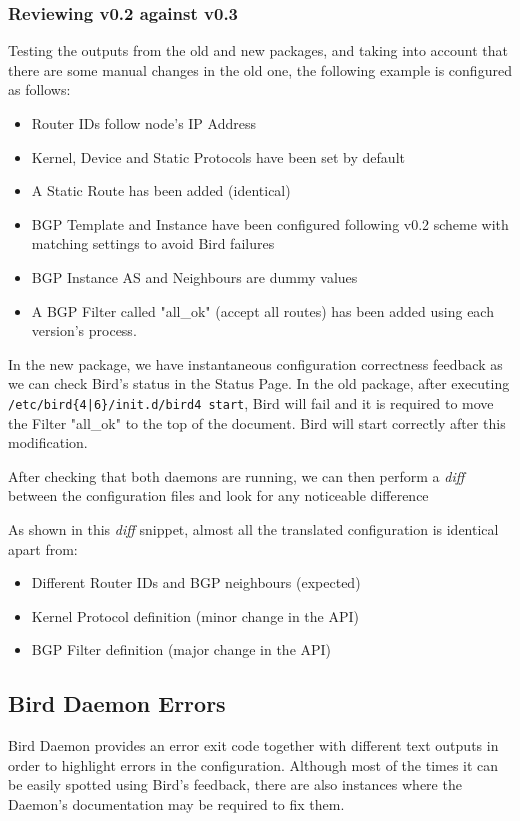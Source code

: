 \subsubsection{Reviewing v0.2 against v0.3}
Testing the outputs from the old and new packages, and taking into account that there are some manual changes in the old one, the following example is configured as follows:

\begin{itemize}
\item Router IDs follow node's IP Address
\item Kernel, Device and Static Protocols have been set by default
\item A Static Route has been added  (identical)
\item BGP Template and Instance have been configured following v0.2 scheme with matching settings to avoid Bird failures
\item BGP Instance AS and Neighbours are dummy values
\item A BGP Filter called "all\_ok" (accept all routes) has been added using each version's process.
\end{itemize}

In the new package, we have instantaneous configuration correctness feedback as we can check Bird's status in the Status Page. 
In the old package, after executing \texttt{/etc/bird\{4|6\}/init.d/bird4 start}, Bird will fail and it is required to move the Filter "all\_ok" to the top of the document. Bird will start correctly after this modification.

After checking that both daemons are running, we can then perform a \textit{diff} between the configuration files and look for any noticeable difference

%


As shown in this \textit{diff} snippet, almost all the translated configuration is identical apart from:

\begin{itemize}
\item Different Router IDs and BGP neighbours (expected)
\item Kernel Protocol definition (minor change in the API)
\item BGP Filter definition (major change in the API)
\end{itemize}

\subsection{Bird Daemon Errors}
Bird Daemon provides an error exit code together with different text outputs in order to highlight errors in the configuration. Although most of the times it can be easily spotted using Bird's feedback, there are also instances where the Daemon's documentation may be required to fix them.

